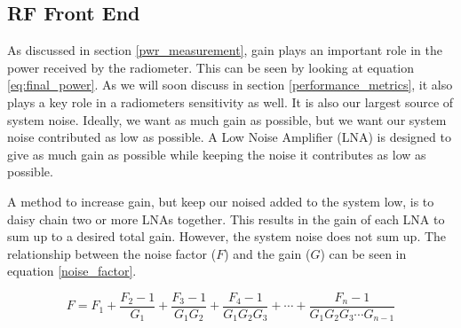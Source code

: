 






\subsection{RF Front End}
As discussed in section \ref{pwr_measurement}, gain plays an important role in the power received by the radiometer.  This can be seen by looking at equation \ref{eq:final_power}.  As we will soon discuss in section \ref{performance_metrics}, it also plays a key role in a radiometers sensitivity as well.  It is also our largest source of system noise.  Ideally, we want as much gain as possible, but we want our system noise contributed as low as possible.  A Low Noise Amplifier (LNA) is designed to give as much gain as possible while keeping the noise it contributes as low as possible.  

A method to increase gain, but keep our noised added to the system low, is to daisy chain two or more LNAs together.  This results in the gain of each LNA to sum up to a desired total gain.  However, the system noise does not sum up.  The relationship between the noise factor ($F$) and the gain ($G$) can be seen in equation \ref{noise_factor}.  

\begin{equation}\label{noise_factor}
F=F_1+\frac{F_2-1}{G_1}+\frac{F_3-1}{G_1 G_2}+\frac{F_4-1}{G_1 G_2 G_3}+\cdots +\frac{F_n-1}{G_1 G_2 G_3 \cdots G_{n-1}}
\end{equation}

